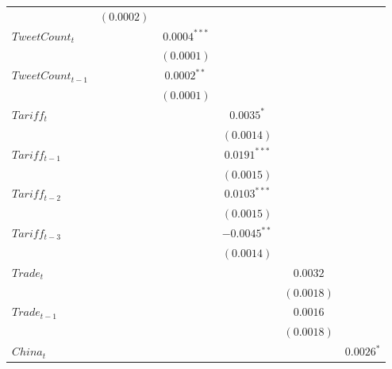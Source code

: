 \documentclass[
]{book}
\begin{document}
\begin{table}
\begin{center}
\begin{tabular}{l c c c c c}
                   & $(0.0002)$      &                 &                 &                 &                 \\
$TweetCount_{t}$   &                 & $0.0004^{***}$  &                 &                 &                 \\
                   &                 & $(0.0001)$      &                 &                 &                 \\
$TweetCount_{t-1}$ &                 & $0.0002^{**}$   &                 &                 &                 \\
                   &                 & $(0.0001)$      &                 &                 &                 \\
$Tariff_{t}$       &                 &                 & $0.0035^{*}$    &                 &                 \\
                   &                 &                 & $(0.0014)$      &                 &                 \\
$Tariff_{t-1}$     &                 &                 & $0.0191^{***}$  &                 &                 \\
                   &                 &                 & $(0.0015)$      &                 &                 \\
$Tariff_{t-2}$     &                 &                 & $0.0103^{***}$  &                 &                 \\
                   &                 &                 & $(0.0015)$      &                 &                 \\
$Tariff_{t-3}$     &                 &                 & $-0.0045^{**}$  &                 &                 \\
                   &                 &                 & $(0.0014)$      &                 &                 \\
$Trade_{t}$        &                 &                 &                 & $0.0032$        &                 \\
                   &                 &                 &                 & $(0.0018)$      &                 \\
$Trade_{t-1}$      &                 &                 &                 & $0.0016$        &                 \\
                   &                 &                 &                 & $(0.0018)$      &                 \\
$China_{t}$        &                 &                 &                 &                 & $0.0026^{*}$    \\

\end{tabular}
\end{center}
\end{table}
\end{document}
